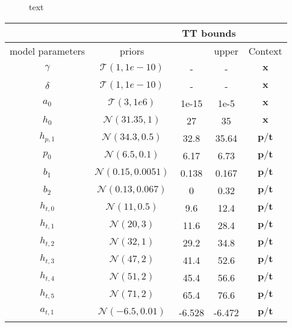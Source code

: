 \begin{figure}[thb!]
	\caption[short text]{text}
\end{figure}

\begin{table}
	\centering
\begin{tabular}{ |c||c|c|c|c|   }
	\hline
	& &\multicolumn{2}{|c|}{TT bounds}&\\
	\hline
	model parameters& priors&\makecell{lower}& \makecell{upper\\
	}&Context\\
	\hline
	$\gamma$ & $\mathcal{T}(1,1e-10)$ &- &-& $\bm{x}$\\
	$\delta$ &$\mathcal{T}(1,1e-10)$ & -&-& $\bm{x}$\\
	$a_0$ &  $\mathcal{T}(3,1e6)$& 1e-15&1e-5&$\bm{x}$\\
	$h_0$ &  $\mathcal{N}(31.35,1)$&27 &35&$\bm{x}$\\
	$h_{p,1}$ &  $\mathcal{N}(34.3,0.5)$& 32.8&35.64&$\bm{p/t}$\\
	$p_0$ &  $\mathcal{N}(6.5,0.1)$&6.17 &6.73&$\bm{p/t}$\\
	$b_1$ &  $\mathcal{N}(0.15,0.0051)$& 0.138  &0.167&$\bm{p/t}$\\
	$b_2$ & $\mathcal{N}(0.13,0.067)$& 0&0.32&$\bm{p/t}$\\
	$h_{t,0}$ &  $\mathcal{N}(11,0.5)$&9.6 &12.4&$\bm{p/t}$\\
	$h_{t,1}$ &  $\mathcal{N}(20,3)$&11.6 &28.4&$\bm{p/t}$\\
	$h_{t,2}$ &  $\mathcal{N}(32,1)$&29.2 &34.8&$\bm{p/t}$\\
	$h_{t,3}$ &  $\mathcal{N}(47,2)$&41.4 &52.6&$\bm{p/t}$\\
	$h_{t,4}$ &  $\mathcal{N}(51,2)$&45.4 &56.6&$\bm{p/t}$\\
	$h_{t,5}$ &  $\mathcal{N}(71,2)$&65.4 &76.6&$\bm{p/t}$\\
	$a_{t,1}$ &  $\mathcal{N}(-6.5,0.01)$&-6.528 &-6.472&$\bm{p/t}$\\

\end{tabular}
\end{table}
